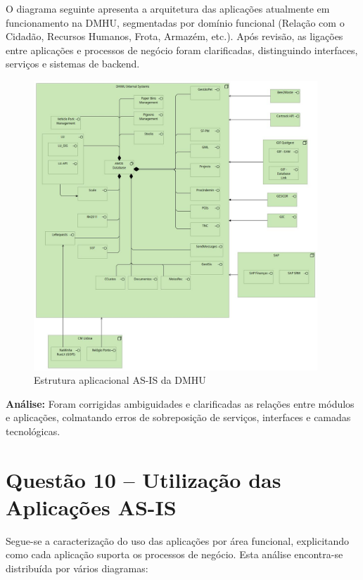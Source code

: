 \documentclass[12pt,a4paper,final]{article}
\begin{document}
    O diagrama seguinte apresenta a arquitetura das aplicações atualmente em funcionamento na DMHU, segmentadas por domínio funcional (Relação com o Cidadão, Recursos Humanos, Frota, Armazém, etc.). Após revisão, as ligações entre aplicações e processos de negócio foram clarificadas, distinguindo interfaces, serviços e sistemas de backend.

    \begin{figure}[H]
        \centering
        \includegraphics[width=0.95\textwidth]{Q9 - Application Structure as Is - Application Structure.jpg}
        \caption{Estrutura aplicacional AS-IS da DMHU}
        \label{fig:q9-app-structure}
    \end{figure}

    \textbf{Análise:} Foram corrigidas ambiguidades e clarificadas as relações entre módulos e aplicações, colmatando erros de sobreposição de serviços, interfaces e camadas tecnológicas.

    \section*{Questão 10 – Utilização das Aplicações AS-IS}

    Segue-se a caracterização do uso das aplicações por área funcional, explicitando como cada aplicação suporta os processos de negócio. Esta análise encontra-se distribuída por vários diagramas:
\end{document}
